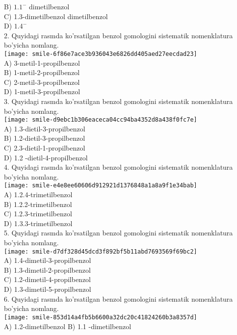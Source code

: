 B) $1.1^{-}$ dimetilbenzol\\
C) 1.3-dimetilbenzol dimetilbenzol\\
D) $1.4^{-}$\\
2. Quyidagi rasmda ko'rsatilgan benzol gomologini sistematik nomenklatura bo'yicha nomlang.\\
\texttt{[image: smile-6f86e7ace3b936043e6826dd405aed27eecdad23]}\\
A) 3-metil-1-propilbenzol\\
B) 1-metil-2-propilbenzol\\
C) 2-metil-3-propilbenzol\\
D) 1-metil-3-propilbenzol\\
3. Quyidagi rasmda ko'rsatilgan benzol gomologini sistematik nomenklatura bo'yicha nomlang.\\
\texttt{[image: smile-d9ebc1b306eaceca04cc94ba4352d8a438f0fc7e]}\\
A) 1.3-dietil-3-propilbenzol\\
B) 1.2-dietil-3-propilbenzol\\
C) 2.3-dietil-1-propilbenzol\\
D) 1.2 -dietil-4-propilbenzol\\
4. Quyidagi rasmda ko'rsatilgan benzol gomologini sistematik nomenklatura bo'yicha nomlang.\\
\texttt{[image: smile-e4e8ee60606d912921d1376848a1a8a9f1e34bab]}\\
A) 1.2.4-trimetilbenzol\\
B) 1.2.2-trimetilbenzol\\
C) 1.2.3-trimetilbenzol\\
D) 1.3.3-trimetilbenzol\\
5. Quyidagi rasmda ko'rsatilgan benzol gomologini sistematik nomenklatura bo'yicha nomlang.\\
\texttt{[image: smile-d7df328d45dcd3f892bf5b11abd7693569f69bc2]}\\
A) 1.4-dimetil-3-propilbenzol\\
B) 1.3-dimetil-2-propilbenzol\\
C) 1.2-dimetil-4-propilbenzol\\
D) 1.3-dimetil-5-propilbenzol\\
6. Quyidagi rasmda ko'rsatilgan benzol gomologini sistematik nomenklatura bo'yicha nomlang.\\
\texttt{[image: smile-853d14a4fb5b6600a32dc20c41824260b3a8357d]}\\
A) 1.2-dimetilbenzol B) 1.1 -dimetilbenzol\\
